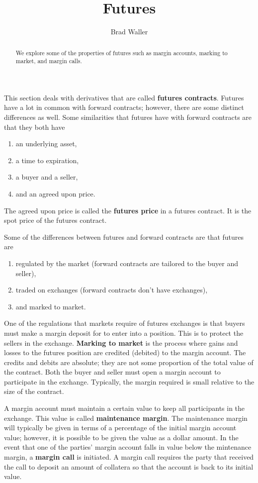 \documentclass{ximera}
\author{Brad Waller}
\title{Futures}
\begin{document}
\begin{abstract}
We explore some of the properties of futures such as margin accounts, marking to market, and margin calls.
\end{abstract}

\maketitle

This section deals with derivatives that are called {\bf futures contracts}. Futures have a lot in common with forward contracts; however, there are some distinct differences as well. Some similarities that futures have with forward contracts are that they both have
\begin{enumerate}
\item an underlying asset,
\item a time to expiration,
\item a buyer and a seller,
\item and an agreed upon price.
\end{enumerate} 
The agreed upon price is called the {\bf futures price} in a futures contract. It is the spot price of the futures contract.

Some of the differences between futures and forward contracts are that futures are
\begin{enumerate}
\item regulated by the market (forward contracts are tailored to the buyer and seller),
\item traded on exchanges (forward contracts don't have exchanges),
\item and marked to market.
\end{enumerate}
One of the regulations that markets require of futures exchanges is that buyers must make a margin deposit for to enter into a position. This is to protect the sellers in the exchange. {\bf Marking to market} is the process where gains and losses to the futures position are credited (debited) to the margin account. The credits and debits are absolute; they are not some proportion of the total value of the contract. Both the buyer and seller must open a margin account to participate in the exchange. Typically, the margin required is small relative to the size of the contract.

A margin account must maintain a certain value to keep all participants in the exchange. This value is called {\bf maintenance margin}. The maintenance margin will typically be given in terms of a percentage of the initial margin account value; however, it is possible to be given the value as a dollar amount. In the event that one of the parties' margin account falls in value below the mintenance margin, a {\bf margin call} is initiated. A margin call requires the party that received the call to deposit an amount of collatera so that the account is back to its initial value. 
\end{document}
